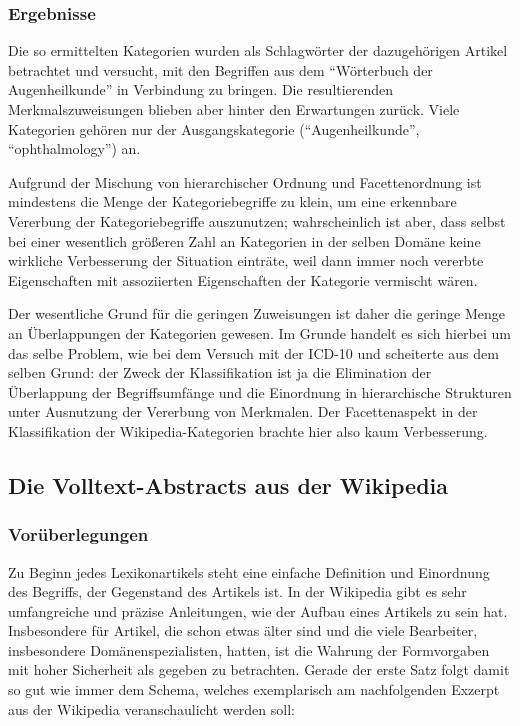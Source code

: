 \documentclass[pagesize,paper=A4,DIV=calc,fontsize=12pt,draft=false]{scrreprt}
\begin{document}
\subsubsection{Ergebnisse}

Die so ermittelten Kategorien wurden als Schlagwörter der dazugehörigen Artikel betrachtet und versucht, mit den Begriffen aus dem \enquote{Wörterbuch der Augenheilkunde} in Verbindung zu bringen. 
Die resultierenden Merkmalszuweisungen blieben aber hinter den Erwartungen zurück. 
Viele Kategorien gehören nur der Ausgangskategorie (\enquote{Augenheilkunde}, \enquote{ophthalmology}) an. 

Aufgrund der Mischung von hierarchischer Ordnung und Facettenordnung ist mindestens die Menge der Kategoriebegriffe zu klein, um eine erkennbare Vererbung der Kategoriebegriffe auszunutzen; wahrscheinlich ist aber, dass selbst bei einer wesentlich größeren Zahl an Kategorien in der selben Domäne keine wirkliche Verbesserung der Situation einträte, weil dann immer noch vererbte Eigenschaften mit assoziierten Eigenschaften der Kategorie vermischt wären. 

Der wesentliche Grund für die geringen Zuweisungen ist daher die geringe Menge an Überlappungen der Kategorien gewesen. 
Im Grunde handelt es sich hierbei um das selbe Problem, wie bei dem Versuch mit der ICD-10 und scheiterte aus dem selben Grund: der Zweck der Klassifikation ist ja die Elimination der Überlappung der Begriffsumfänge und die Einordnung in hierarchische Strukturen unter Ausnutzung der Vererbung von Merkmalen. 
Der Facettenaspekt in der Klassifikation der Wikipedia-Kategorien brachte hier also kaum Verbesserung. 

\subsection{Die Volltext-Abstracts aus der Wikipedia}

\subsubsection{Vorüberlegungen}

Zu Beginn jedes Lexikonartikels steht eine einfache Definition und Einordnung des Begriffs, der Gegenstand des Artikels ist. 
In der Wikipedia gibt es sehr umfangreiche und präzise Anleitungen, wie der Aufbau eines Artikels zu sein hat. 
Insbesondere für Artikel, die schon etwas älter sind und die viele Bearbeiter, insbesondere Domänenspezialisten, hatten, ist die Wahrung der Formvorgaben mit hoher Sicherheit als gegeben zu betrachten. 
Gerade der erste Satz folgt damit so gut wie immer dem Schema, welches exemplarisch am nachfolgenden Exzerpt aus der Wikipedia veranschaulicht werden soll: 
\end{document}
